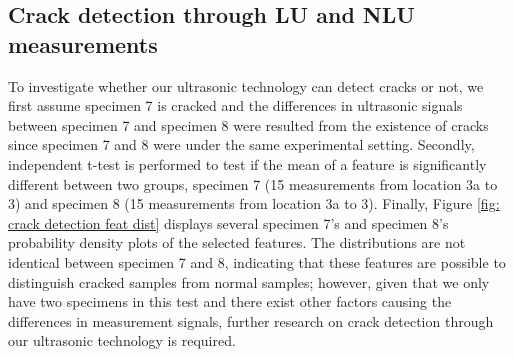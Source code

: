 \subsection{Crack detection through LU and NLU measurements}
To investigate whether our ultrasonic technology can detect cracks or not, we first assume specimen 7 is cracked and the differences in ultrasonic signals between specimen 7 and specimen 8 were resulted from the existence of cracks since specimen 7 and 8 were under the same experimental setting. Secondly, independent t-test is performed to test if the mean of a feature is significantly different between two groups, specimen 7 (15 measurements from location 3a to 3) and specimen 8 (15 measurements from location 3a to 3). Finally, Figure \ref{fig: crack detection feat dist} displays several specimen 7's and specimen 8's probability density plots of the selected features. The distributions are not identical between specimen 7 and 8, indicating that these features are possible to distinguish cracked samples from normal samples; however, given that we only have two specimens in this test and there exist other factors causing the differences in measurement signals, further research on crack detection through our ultrasonic technology is required.

